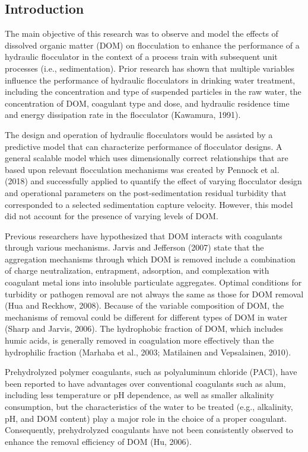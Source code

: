 \documentclass[letterpaper,10pt,english]{sphinxmanual}
\begin{document}
\subsection{Introduction}
\label{\detokenize{Flocculation/Floc_Model:introduction}}
The main objective of this research was to observe and model the effects of dissolved organic matter (DOM) on flocculation to enhance the performance of a hydraulic flocculator in the context of a process train with subsequent unit processes (i.e., sedimentation). Prior research has shown that multiple variables influence the performance of hydraulic flocculators in drinking water treatment, including the concentration and type of suspended particles in the raw water, the concentration of DOM, coagulant type and dose, and hydraulic residence time and energy dissipation rate in the flocculator (Kawamura, 1991).

The design and operation of hydraulic flocculators would be assisted by a predictive model that can characterize performance of flocculator designs. A general scalable model which uses dimensionally correct relationships that are based upon relevant flocculation mechanisms was created by Pennock et al. (2018) and successfully applied to quantify the effect of varying flocculator design and operational parameters on the post-sedimentation residual turbidity that corresponded to a selected sedimentation capture velocity. However, this model did not account for the presence of varying levels of DOM.

Previous researchers have hypothesized that DOM interacts with coagulants through various mechanisms. Jarvis and Jefferson (2007) state that the aggregation mechanisms through which DOM is removed include a combination of charge neutralization, entrapment, adsorption, and complexation with coagulant metal ions into insoluble particulate aggregates. Optimal conditions for turbidity or pathogen removal are not always the same as those for DOM removal (Hua and Reckhow, 2008). Because of the variable composition of DOM, the mechanisms of removal could be different for different types of DOM in water (Sharp and Jarvis, 2006). The hydrophobic fraction of DOM, which includes humic acids, is generally removed in coagulation more effectively than the hydrophilic fraction (Marhaba et al., 2003; Matilainen and Vepsalainen, 2010).

Prehydrolyzed polymer coagulants, such as polyaluminum chloride (PACl), have been reported to have advantages over conventional coagulants such as alum, including less temperature or pH dependence, as well as smaller alkalinity consumption, but the characteristics of the water to be treated (e.g., alkalinity, pH, and DOM content) play a major role in the choice of a proper coagulant. Consequently, prehydrolyzed coagulants have not been consistently observed to enhance the removal efficiency of DOM (Hu, 2006).
\end{document}
